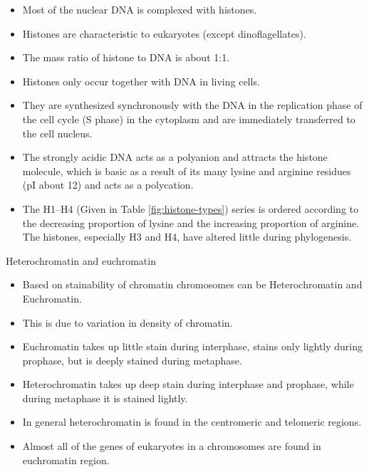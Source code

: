 \documentclass[11pt,dvipsnames,ignorenonframetext,aspectratio=169]{beamer}
\providecommand{\tightlist}{%
  \setlength{\itemsep}{0pt}\setlength{\parskip}{0pt}}
\begin{document}
\begin{frame}{}
\protect\hypertarget{section-5}{}
\small

\begin{itemize}
\tightlist
\item
  Most of the nuclear DNA is complexed with histones.
\item
  Histones are characteristic to eukaryotes (except dinoflagellates).
\item
  The mass ratio of histone to DNA is about 1:1.
\item
  Histones only occur together with DNA in living cells.
\item
  They are synthesized synchronously with the DNA in the replication
  phase of the cell cycle (S phase) in the cytoplasm and are immediately
  transferred to the cell nucleus.
\item
  The strongly acidic DNA acts as a polyanion and attracts the histone
  molecule, which is basic as a result of its many lysine and arginine
  residues (pI about 12) and acts as a polycation.
\item
  The H1--H4 (Given in Table \ref{fig:histone-types}) series is ordered
  according to the decreasing proportion of lysine and the increasing
  proportion of arginine. The histones, especially H3 and H4, have
  altered little during phylogenesis.
\end{itemize}
\end{frame}

\begin{frame}{Heterochromatin and euchromatin}
\protect\hypertarget{heterochromatin-and-euchromatin}{}
\begin{itemize}
\tightlist
\item
  Based on stainability of chromatin chromosomes can be Heterochromatin
  and Euchromatin.
\item
  This is due to variation in density of chromatin.
\item
  Euchromatin takes up little stain during interphase, stains only
  lightly during prophase, but is deeply stained during metaphase.
\item
  Heterochromatin takes up deep stain during interphase and prophase,
  while during metaphase it is stained lightly.
\item
  In general heterochromatin is found in the centromeric and telomeric
  regions.
\item
  Almost all of the genes of eukaryotes in a chromosomes are found in
  euchromatin region.
\end{itemize}
\end{frame}
\end{document}
